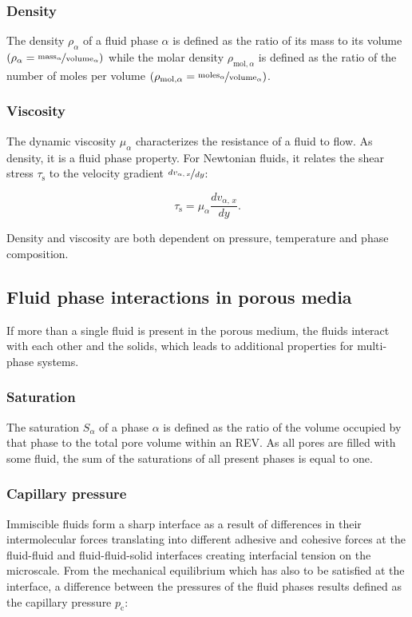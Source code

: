 \subsubsection{Density}\label{sec:density}
The density $\rho_\alpha$ of a fluid phase $\alpha$ is defined as the ratio of its mass to its volume
$(\rho_\alpha = \nicefrac{\mathrm{mass_\alpha}}{\mathrm{volume_\alpha}})$ while 
the molar density $\rho_{\mathrm{mol},\alpha}$ is defined as the ratio of the number of moles per volume 
$(\rho_{\mathrm{mol},\alpha} = \nicefrac{\mathrm{moles_\alpha}}{\mathrm{volume_\alpha}})$.

\subsubsection{Viscosity}\label{sec:viscosity}
The dynamic viscosity $\mu_\alpha$ characterizes the resistance of a fluid to flow. 
As density, it is a fluid phase property.  
For Newtonian fluids, it relates the shear stress $\tau_\mathrm{s}$ to the  
velocity gradient $\nicefrac{d v_{\alpha,\,x}}{d y}$: 

\begin{equation}\label{eq:def_viscosity}
\tau_\mathrm{s} = \mu_\alpha \frac{d v_{\alpha,\,x}}{d y}.
\end{equation}

Density and viscosity are both dependent on pressure, temperature and phase composition. 

\subsection[Fluid phase interactions in porous media]{Fluid phase interactions in porous media}\label{sec:fluid_interact}
If more than a single fluid is present in the porous medium, the fluids interact with each other and the solids, which leads to additional properties for multi-phase systems. 

\subsubsection{Saturation}\label{sec:saturation}
The saturation $S_\alpha$ of a phase $\alpha$ is defined as the ratio of the volume occupied 
by that phase to the total pore volume within an REV. 
As all pores are filled with some fluid, the sum of the saturations of all present phases is equal to one.

\subsubsection{Capillary pressure}\label{sec:pc}
Immiscible fluids form a sharp interface as a result of differences in their intermolecular forces 
translating into different adhesive and cohesive forces at the fluid-fluid and fluid-fluid-solid interfaces 
creating interfacial tension on the microscale. 
From the mechanical equilibrium which has also to be satisfied at the interface, 
a difference between the pressures of the fluid phases results defined as 
the capillary pressure $p_\mathrm{c}$:  

